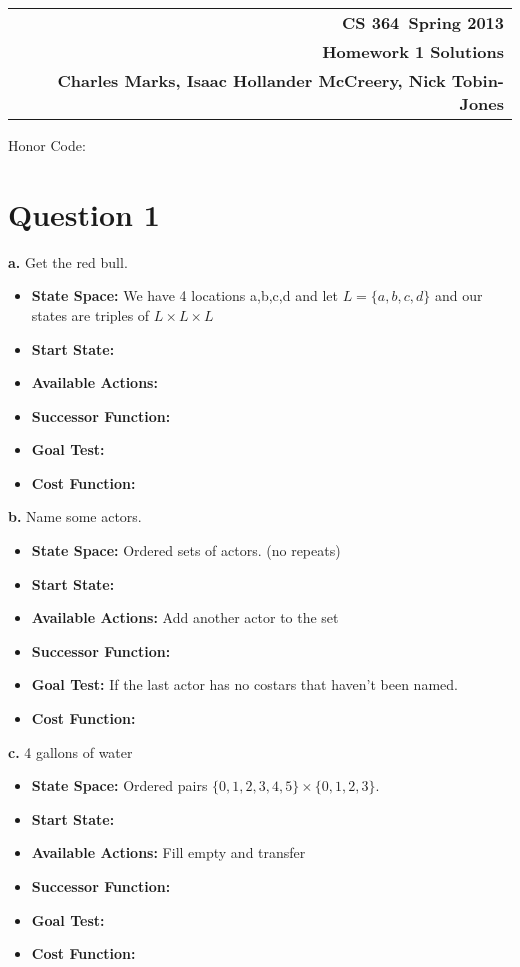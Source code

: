 \documentclass[11pt]{article}
\makeatletter
\newcommand{\course}{CS 364}
\newcommand{\semester}{Spring 2013}
\newcommand{\hwk}{Homework 1 Solutions}
\newcommand{\student}{Charles Marks, Isaac Hollander McCreery, Nick Tobin-Jones}
\renewcommand\maketitle{
\begin{center}
\begin{tabular*}{6.44in}{l @{\extracolsep{\fill}}c r}
\bfseries  &  & \bfseries \course ~\semester \\
\bfseries&  & \bfseries  \hwk  \\
\bfseries   &   &  \bfseries \student \\ 
\end{tabular*}
\end{center} }
\makeatother
\begin{document}
\maketitle
\thispagestyle{plain}

\noindent Honor Code: 


\section*{Question 1}

\textbf{a.}  Get the red bull.
\begin{itemize}
\item \textbf{State Space:}  We have 4 locations a,b,c,d  and let $L = \{a,b,c,d\}$ and our states are triples of $L \times L \times L$
\item \textbf{Start State:}
\item \textbf{Available Actions:}
\item \textbf{Successor Function:}
\item \textbf{Goal Test:}
\item \textbf{Cost Function:}

\end{itemize}

\textbf{b.}  Name some actors.
\begin{itemize}
\item \textbf{State Space:} Ordered sets of actors.  (no repeats)
\item \textbf{Start State:}
\item \textbf{Available Actions:} Add another actor to the set
\item \textbf{Successor Function:}
\item \textbf{Goal Test:} If the last actor has no costars that haven't been named.
\item \textbf{Cost Function:}

\end{itemize}

\textbf{c.} 4 gallons of water
\begin{itemize}
\item \textbf{State Space:} Ordered pairs $\{0,1,2,3,4,5\} \times \{0,1,2,3\}$.  
\item \textbf{Start State:}
\item \textbf{Available Actions:} Fill empty and transfer
\item \textbf{Successor Function:}
\item \textbf{Goal Test:} 
\item \textbf{Cost Function:}

\end{itemize}
\end{document}
